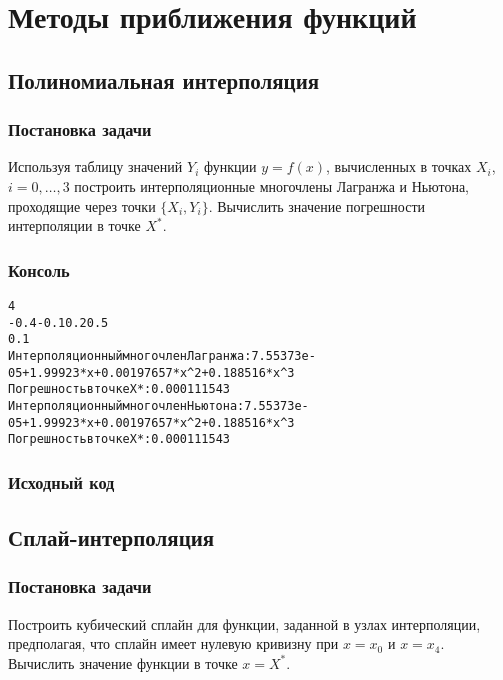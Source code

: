 \graphicspath{{images/}}

\section{Методы приближения функций}

\subsection{Полиномиальная интерполяция}

\subsubsection{Постановка задачи}
Используя таблицу значений $Y_i$ функции $y = f(x)$, вычисленных в точках $X_i$, $i = 0, \dots ,3$  построить интерполяционные многочлены Лагранжа и Ньютона, проходящие через точки $\{X_i, Y_i\}$. Вычислить значение погрешности интерполяции в точке $X^*$.

\subsubsection{Консоль}
\begin{alltt}
4
-0.4 -0.1 0.2 0.5
0.1
Интерполяционный многочлен Лагранжа: 7.55373e-05 + 1.99923 * x + 0.00197657 * x^2 + 0.188516 * x^3
Погрешность в точке Х*: 0.000111543
Интерполяционный многочлен Ньютона: 7.55373e-05 + 1.99923 * x + 0.00197657 * x^2 + 0.188516 * x^3
Погрешность в точке Х*: 0.000111543
\end{alltt}

\subsubsection{Исходный код}

\pagebreak

\subsection{Сплай-интерполяция}

\subsubsection{Постановка задачи}
Построить кубический сплайн для функции, заданной в узлах интерполяции,
предполагая, что сплайн имеет нулевую кривизну при $x = x_0$ и $x = x_4$. Вычислить значение функции в точке $x = X^*$.

